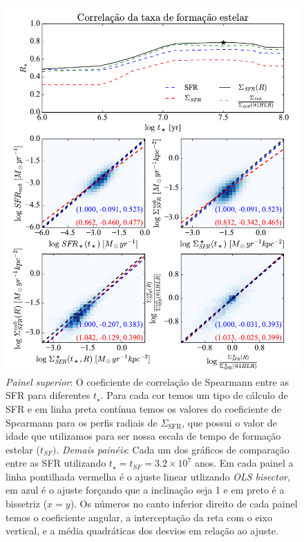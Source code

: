 \begin{figure}
	\centering
	\includegraphics[scale=0.7, clip]{figuras/Rs_allSFR.pdf}
	\caption[Comparação entre as SFR.]
	{\emph{Painel superior}: O coeficiente de correlação de Spearmann entre as SFR para diferentes
$t_\star$. Para cada cor temos um tipo de cálculo de SFR e em linha preta contínua temos os valores
do coeficiente de Spearmann para os perfis radiais de $\Sigma_{\mathrm{SFR}}$, que possui o valor de
idade que utilizamos para ser nossa escala de tempo de formação estelar ($t_{SF})$. \emph{Demais
painéis}: Cada um dos gráficos de comparação entre as SFR utilizando $t_\star = t_{SF} = 3.2 \times
10^7$ anos. Em cada painel a linha pontilhada vermelha é o ajuste linear utlizando {\em OLS
bisector}, em azul é o ajuste forçando que a inclinação seja 1 e em preto é a bissetriz ($x = y$).
Os números no canto inferior direito de cada painel temos o coeficiente angular, a interceptação da
reta com o eixo vertical, e a média quadráticas dos desvios em relação ao ajuste.}
	\label{fig:SFRsynvsneb}
\end{figure}

